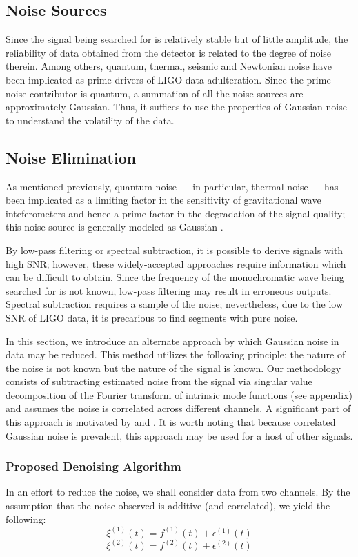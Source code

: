 \documentclass[onecolumn, groupedaddress, 10pt]{revtex4-1}
\begin{document}
\subsection{Noise Sources}
Since the signal being searched for is relatively stable but of little amplitude, the reliability of data obtained from the detector is related to the degree of noise therein. Among others, quantum, thermal, seismic and Newtonian noise have been implicated as prime drivers of LIGO data adulteration. Since the prime noise contributor is quantum, a summation of all the noise sources are approximately Gaussian. Thus, it suffices to use the properties of Gaussian noise to understand the volatility of the data.

\subsection{Noise Elimination}
As mentioned previously, quantum noise --- in particular, thermal noise --- has been implicated as a limiting factor in the sensitivity of gravitational wave inteferometers and hence a prime factor in the degradation of the signal quality; this noise source is generally modeled as Gaussian \citep{Saulson}.

By low-pass filtering or spectral subtraction, it is possible to derive signals with high SNR; however, these widely-accepted approaches require information which can be difficult to obtain. Since the frequency of the monochromatic wave being searched for is not known, low-pass filtering may result in erroneous outputs. Spectral subtraction requires a sample of the noise; nevertheless, due to the low SNR of LIGO data, it is precarious to find segments with pure noise.

In this section, we introduce an alternate approach by which Gaussian noise in data may be reduced. This method utilizes the following principle: the nature of the noise is not known but the nature of the signal is known. Our methodology consists of subtracting estimated noise from the signal via singular value decomposition of the Fourier transform of intrinsic mode functions (see appendix) and assumes the noise is correlated across different channels. A significant part of this approach is motivated by \cite{} and \cite{}. It is worth noting that because correlated Gaussian noise is prevalent, this approach may be used for a host of other signals.

\subsubsection{Proposed Denoising Algorithm}
In an effort to reduce the noise, we shall consider data from two channels. By the assumption that the noise observed is additive (and correlated), we yield the following:
\begin{equation}
\xi^{(1)}(t) = f^{(1)}(t) + \epsilon^{(1)}(t)
\end{equation}
\begin{equation}
\xi^{(2)}(t) = f^{(2)}(t) + \epsilon^{(2)}(t)
\end{equation}
\end{document}
